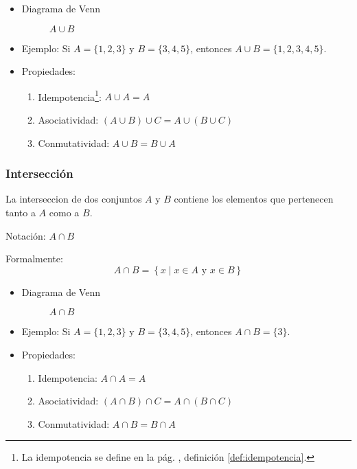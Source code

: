 \begin{itemize}
	\item Diagrama de Venn
	\begin{figure}[H]
		\centering
		\begin{venndiagram2sets}
			\fillA \fillB
		\end{venndiagram2sets}
		\caption*{$A \cup B$}
	\end{figure}
	\item Ejemplo:
	Si \(A = \{1, 2, 3\}\) y \(B = \{3, 4, 5\}\), entonces \(A \cup B = \{1, 2, 3, 4, 5\}\).
	
	\item Propiedades:
	\begin{enumerate}[label=\roman*)]
		\item Idempotencia\footnote{La idempotencia se define en la pág.  \pageref{def:idempotencia}, definición \ref{def:idempotencia}.}: \( A \cup A = A \)
		\item Asociatividad: \( \left( A \cup B \right) \cup C = A \cup \left( B \cup C \right) \)
		\item Conmutatividad: \( A \cup B = B \cup A\)
	\end{enumerate}
\end{itemize}

\subsubsection{Intersección }
\vspace{1em} 
\begin{fmd-definition}[Intersección]
	La \gls{interseccion} de dos conjuntos \(A\) y \(B\) contiene los elementos que pertenecen tanto a \(A\) como a \(B\).
	
	Notación: \(A \cap B\)
	
	Formalmente:
	\[ A \cap B = \left\{ x \mid x \in A \mbox{ y } x \in B \right\} \]
\end{fmd-definition}

\begin{itemize}
	\item Diagrama de Venn
	\begin{figure}[H]
		\centering
		\begin{venndiagram2sets}
			\fillACapB
		\end{venndiagram2sets}
		\caption*{\(A \cap B \)}
	\end{figure}
	\item Ejemplo:
	Si \(A = \{1, 2, 3\}\) y \(B = \{3, 4, 5\}\), entonces \(A \cap B = \{3\}\).
	
	\item Propiedades:
	\begin{enumerate}[label=\roman*)]
		\item Idempotencia: \( A \cap A = A \) 
		\item Asociatividad: \( \left( A \cap B \right) \cap C = A \cap \left( B \cap C \right) \) 
		\item Conmutatividad: \( A \cap B = B \cap A\) 
	\end{enumerate}
\end{itemize}

